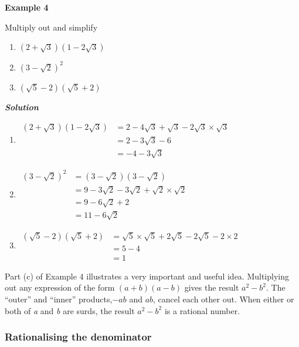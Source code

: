 \documentclass[
]{article}
\providecommand{\tightlist}{%
  \setlength{\itemsep}{0pt}\setlength{\parskip}{0pt}}
\begin{document}
\textbf{Example 4}

Multiply out and simplify

\begin{enumerate}
\def\labelenumi{(\alph{enumi})}
\tightlist
\item
  \((2 + \sqrt 3 )(1 - 2\sqrt 3 )\)
\item
  \({(3 - \sqrt 2 )^2}\)
\item
  \((\sqrt 5 - 2)(\sqrt 5 + 2)\)
\end{enumerate}

\textbf{\emph{Solution}}

\begin{enumerate}
\def\labelenumi{(\alph{enumi})}
\item
  \(\begin{align} (2 + \sqrt 3 )(1 - 2\sqrt 3 ) &= 2 - 4\sqrt 3 + \sqrt 3 - 2\sqrt 3 \times \sqrt 3 \\  &= 2 - 3\sqrt 3 - 6\\  &= - 4 - 3\sqrt 3 \end{align}\)
\item
  \(\begin{align} {(3 - \sqrt 2 )^2} &= (3 - \sqrt 2 )(3 - \sqrt 2 )\\  &= 9 - 3\sqrt 2 - 3\sqrt 2 + \sqrt 2 \times \sqrt 2 \\  &= 9 - 6\sqrt 2 + 2\\  &= 11 - 6\sqrt 2 \end{align}\)
\item
  \(\begin{align} (\sqrt 5 - 2)(\sqrt 5 + 2) &= \sqrt 5 \times \sqrt 5 + 2\sqrt 5 - 2\sqrt 5 - 2 \times 2\\  &= 5 - 4\\  &= 1 \end{align}\)
\end{enumerate}

Part (c) of Example 4 illustrates a very important and useful idea.
Multiplying out any expression of the form \((a+b)(a-b)\) gives the
result \(a^{2}-b^{2}\). The ``outer'' and ``inner'' products,\(-ab\) and
\(ab\), cancel each other out. When either or both of \emph{a} and
\emph{b} are surds, the result \(a^{2}-b^{2}\) is a rational number.

\hypertarget{rationalising-the-denominator}{%
\subsubsection{Rationalising the
denominator}\label{rationalising-the-denominator}}
\end{document}
